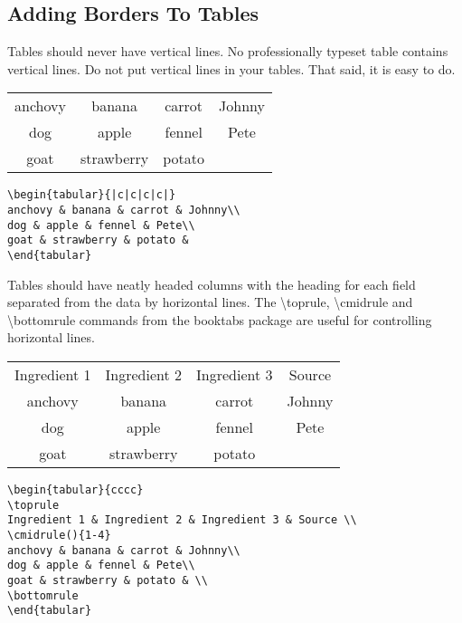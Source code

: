 \subsection{Adding Borders To Tables}
\label{sec:vertLines}
Tables should never have vertical lines. No professionally typeset table contains vertical lines. Do not put vertical lines in your tables. That said, it is easy to do.

\begin{center}
\begin{tabular}{|c|c|c|c|}
anchovy & banana & carrot & Johnny\\
dog & apple & fennel & Pete\\
goat & strawberry & potato &
\end{tabular}

\vspace*{2ex}

\begin{verbatim}
\begin{tabular}{|c|c|c|c|}
anchovy & banana & carrot & Johnny\\
dog & apple & fennel & Pete\\
goat & strawberry & potato &
\end{tabular}
\end{verbatim}
\end{center}

\vspace*{2ex}

Tables should have neatly headed columns with the heading for each field separated from the data by horizontal lines. The {\textbackslash}toprule, {\textbackslash}cmidrule{} and {\textbackslash}bottomrule commands from the booktabs package are useful for controlling horizontal lines.

\begin{center}
\begin{tabular}{cccc}
\toprule
Ingredient 1 & Ingredient 2 & Ingredient 3 & Source \\
\cmidrule(){1-4}
anchovy & banana & carrot & Johnny\\
dog & apple & fennel & Pete\\
goat & strawberry & potato & \\
\bottomrule
\end{tabular}

\vspace*{2ex}

\begin{verbatim}
\begin{tabular}{cccc}
\toprule
Ingredient 1 & Ingredient 2 & Ingredient 3 & Source \\
\cmidrule(){1-4}
anchovy & banana & carrot & Johnny\\
dog & apple & fennel & Pete\\
goat & strawberry & potato & \\
\bottomrule
\end{tabular}
\end{verbatim}
\end{center}

